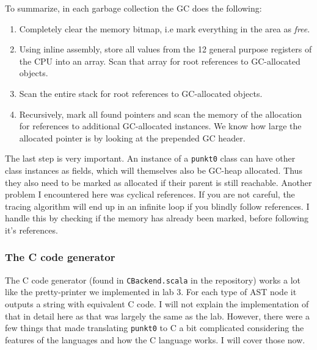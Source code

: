 To summarize, in each garbage collection the GC does the following:
\begin{enumerate}
    \item Completely clear the memory bitmap, i.e mark everything in the area as \textit{free}.
    \item Using inline assembly, store all values from the 12 general purpose registers of the CPU into an array. Scan that array for root references to GC-allocated objects.
    \item Scan the entire stack for root references to GC-allocated objects.
    \item Recursively, mark all found pointers and scan the memory of the allocation for references to additional GC-allocated instances. We know how large the allocated pointer is by looking at the prepended GC header.
\end{enumerate}
The last step is very important. An instance of a \texttt{punkt0} class can have other class instances as fields, which will themselves also be GC-heap allocated. Thus they also need to be marked as allocated if their parent is still reachable. Another problem I encountered here was cyclical references. If you are not careful, the tracing algorithm will end up in an infinite loop if you blindly follow references. I handle this by checking if the memory has already been marked, before following it's references.

\subsubsection{The C code generator}
The C code generator (found in \texttt{CBackend.scala} in the repository) works a lot like the pretty-printer we implemented in lab 3. For each type of AST node it outputs a string with equivalent C code. I will not explain the implementation of that in detail here as that was largely the same as the lab. However, there were a few things that made translating \texttt{punkt0} to C a bit complicated considering the features of the languages and how the C language works. I will cover those now.

